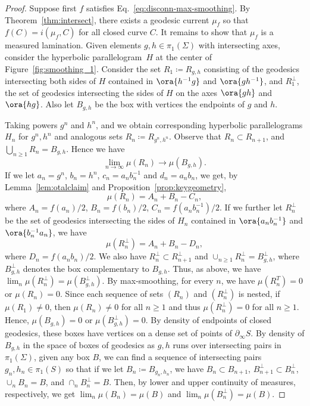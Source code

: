 \begin{proof}
Suppose first $f$ satisfies Eq.~\eqref{eq:disconn-max-smoothing}.
By Theorem~\ref{thm:intersect}, there exists a geodesic current $\mu_f$ so that $f(C)=i(\mu_f,C)$ for all closed curve $C$.
It remains to show that $\mu_f$ is a measured lamination.
Given elements $g, h \in \pi_1(\Sigma)$ with intersecting axes,
consider the hyperbolic parallelogram~$H$ at the center of
Figure~\ref{fig:smoothing_1}.
Consider the set $R_1 \coloneqq R_{g,h}$ consisting of the geodesics intersecting both sides of $H$ contained in $\ora{h^{-1}g}$ and $\ora{gh^{-1}}$,
and
$R_1^{\perp}$, the set of geodesics intersecting the sides of $H$ on the axes $\ora{gh}$ and $\ora{hg}$.
Also let $B_{g,h}$ be the box with vertices the endpoints of $g$ and $h$.

Taking powers $g^n$ and $h^n$, and we obtain corresponding hyperbolic
parallelograms $H_n$ for $g^n,h^n$ and analogous sets $R_n \coloneqq
R_{g^n,h^n}$.
Observe that $R_n \subset R_{n+1}$, and $\bigcup_{n \geq 1} R_n = B_{g,h}$.
Hence we have
\[
\lim_{n\to\infty} \mu(R_n) \to \mu(B_{g,h}).
\]
If we let $a_n=g^n$, $b_n=h^n$, $c_n=a_n b_n^{-1}$ and $d_n=a_n b_n$,
we get, by Lemma~\ref{lem:otalclaim} and Proposition~\ref{prop:keygeometry},
\[\mu(R_n)=A_n + B_n-C_n,\]
where $A_n=f(a_n)/2$, $B_n=f(b_n)/2$, $C_n=f(a_nb_n^{-1})/2$.
If we further let $R_n^{\perp}$ be the set of geodesics intersecting the sides of $H_n$ contained in $\ora{a_nb_n^{-1}}$ and $\ora{b_n^{-1}a_n}$, we have
\[
\mu(R_n^\perp)=A_n + B_n -D_n,
\]
where $D_n=f(a_nb_n)/2$.
We also have $R_n^{\perp} \subset R_{n+1}^{\perp}$ and $\cup_{n \geq 1} R_n^{\perp} = B_{g,h}^{\perp}$, where $B_{g,h}^{\perp}$ denotes the box complementary to $B_{g,h}$.
Thus, as above, we have $\lim_n \mu(R_n^{\perp})=\mu(B_{g,h}^{\perp})$.
By max-smoothing, for every $n$, we have $\mu(R_n^T)=0$ or $\mu(R_n)=0$.
Since each sequence of sets $(R_n)$ and $(R_n^{\perp})$ is nested, if $\mu(R_1) \neq 0$, then $\mu(R_n) \neq 0$ for all $n \geq 1$ and thus $\mu(R_n^{\perp})=0$ for all $n \geq 1$.
Hence, $\mu(B_{g,h})=0$ or $\mu(B_{g,h}^{\perp})=0$.
By density of endpoints of closed geodesics, these boxes have vertices on a dense set of points of $\partial_{\infty} S$.
By density of $B_{g,h}$ in the space of boxes of geodesics as $g,h$ runs over intersecting pairs in $\pi_1(\Sigma)$, given any box $B$, we can find a sequence of intersecting pairs $g_n, h_n \in \pi_1(S)$ so that if we let $B_n \coloneqq B_{g_n, h_n}$, we have $B_n \subset B_{n+1}$, $B_{n+1}^{\perp} \subset B_{n}^{\perp}$, $\cup_n B_n = B$, and $\cap_n B_n^{\perp} = B$.
Then, by lower and upper continuity of measures, respectively, we get $\lim_n \mu(B_n) =\mu(B)$ and $\lim_n \mu(B_n^{\perp}) = \mu(B)$.


\end{proof}
